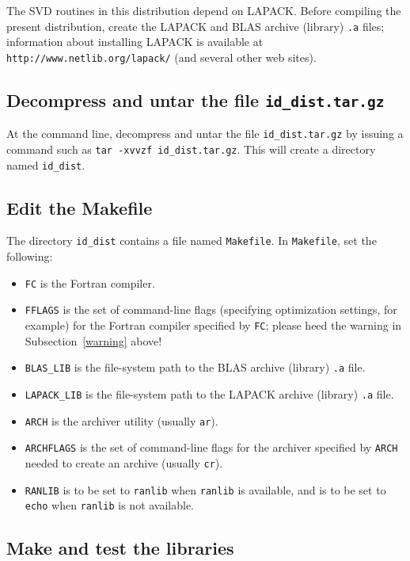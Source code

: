 ﻿\documentclass[letterpaper,12pt]{article}
\begin{document}
The SVD routines in this distribution depend on LAPACK.
Before compiling the present distribution,
create the LAPACK and BLAS archive (library) {\tt .a} files;
information about installing LAPACK is available
at {\tt http://www.netlib.org/lapack/} (and several other web sites).


\subsection{Decompress and untar the file {\tt id\_dist.tar.gz}}

At the command line, decompress and untar the file
{\tt id\_dist.tar.gz} by issuing a command such as
{\tt tar -xvvzf id\_dist.tar.gz}.
This will create a directory named {\tt id\_dist}.


\subsection{Edit the Makefile}
\label{makefile_edit}

The directory {\tt id\_dist} contains a file named {\tt Makefile}.
In {\tt Makefile}, set the following:
%
\begin{itemize}
\item {\tt FC} is the Fortran compiler.
\item {\tt FFLAGS} is the set of command-line flags
      (specifying optimization settings, for example)
      for the Fortran compiler specified by {\tt FC};
      please heed the warning in Subsection~\ref{warning} above!
\item {\tt BLAS\_LIB} is the file-system path to the BLAS archive
      (library) {\tt .a} file.
\item {\tt LAPACK\_LIB} is the file-system path to the LAPACK archive
      (library) {\tt .a} file.
\item {\tt ARCH} is the archiver utility (usually {\tt ar}).
\item {\tt ARCHFLAGS} is the set of command-line flags
      for the archiver specified by {\tt ARCH} needed
      to create an archive (usually {\tt cr}).
\item {\tt RANLIB} is to be set to {\tt ranlib}
      when {\tt ranlib} is available, and is to be set to {\tt echo}
      when {\tt ranlib} is not available.
\end{itemize}


\subsection{Make and test the libraries}
\end{document}
